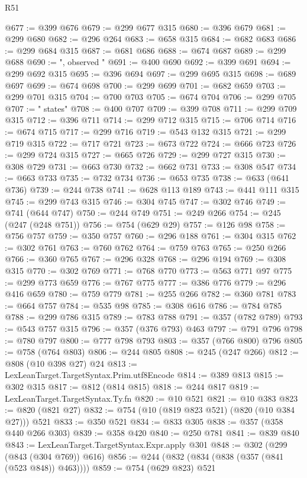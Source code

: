 \begin{lexlean}{R51}
\begin{coremodule}
@677 := @399 @676
@679 := @299 @677 @315
@680 := @396 @679
@681 := @299 @680
@682 := @296 @264
@683 := @658 @315
@684 := @682 @683
@686 := @299 @684 @315
@687 := @681 @686
@688 := @674 @687
@689 := @299 @688
@690 := ", observed "
@691 := @400 @690
@692 := @399 @691
@694 := @299 @692 @315
@695 := @396 @694
@697 := @299 @695 @315
@698 := @689 @697
@699 := @674 @698
@700 := @299 @699
@701 := @682 @659
@703 := @299 @701 @315
@704 := @700 @703
@705 := @674 @704
@706 := @299 @705
@707 := " states"
@708 := @400 @707
@709 := @399 @708
@711 := @299 @709 @315
@712 := @396 @711
@714 := @299 @712 @315
@715 := @706 @714
@716 := @674 @715
@717 := @299 @716
@719 := @543 @132 @315
@721 := @299 @719 @315
@722 := @717 @721
@723 := @673 @722
@724 := @666 @723
@726 := @299 @724 @315
@727 := @665 @726
@729 := @299 @727 @315
@730 := @308 @729
@731 := @663 @730
@732 := @662 @731
@733 := @308 @547
@734 := @663 @733
@735 := @732 @734
@736 := @653 @735
@738 := @633 (@641 @736)
@739 := @244 @738
@741 := @628 @113 @189
@743 := @441 @111 @315
@745 := @299 @743 @315
@746 := @304 @745
@747 := @302 @746
@749 := @741 (@644 @747)
@750 := @244 @749
@751 := @249 @266
@754 := @245 (@247 (@248 @751))
@756 := @754 (@629 @29)
@757 := @126 @98
@758 := @756 @757
@759 := @350 @757
@760 := @296 @188
@761 := @304 @315
@762 := @302 @761
@763 := @760 @762
@764 := @759 @763
@765 := @250 @266
@766 := @360 @765
@767 := @296 @328
@768 := @296 @194
@769 := @308 @315
@770 := @302 @769
@771 := @768 @770
@773 := @563 @771 @97
@775 := @299 @773 @659
@776 := @767 @775
@777 := @386 @776
@779 := @296 @416 @659
@780 := @759 @779
@781 := @255 @266
@782 := @360 @781
@783 := @664 @757
@784 := @535 @98
@785 := @308 @616
@786 := @784 @785
@788 := @299 @786 @315
@789 := @783 @788
@791 := @357 (@782 @789)
@793 := @543 @757 @315
@796 := @357 (@376 @793) @463
@797 := @791 @796
@798 := @780 @797
@800 := @777 @798 @793
@803 := @357 (@766 @800) @796
@805 := @758 (@764 @803)
@806 := @244 @805
@808 := @245 (@247 @266)
@812 := @808 (@10 @398 @27) @24
@813 := LexLeanTarget.TargetSyntax.Prim.utf8Encode
@814 := @389 @813
@815 := @302 @315
@817 := @812 (@814 @815)
@818 := @244 @817
@819 := LexLeanTarget.TargetSyntax.Ty.fn
@820 := @10 @521
@821 := @10 @383
@823 := @820 (@821 @27)
@832 := @754 (@10 (@819 @823 @521) (@820 (@10 @384 @27))) @521
@833 := @350 @521
@834 := @833 @305
@838 := @357 (@358 @440 @266 @303)
@839 := @358 @420
@840 := @250 @781
@841 := @839 @840
@843 := LexLeanTarget.TargetSyntax.Expr.apply @301
@848 := @302 (@299 (@843 (@304 @769)) @616)
@856 := @244 (@832 (@834 (@838 (@357 (@841 (@523 @848)) @463))))
@859 := @754 (@629 @823) @521

\end{coremodule}
\end{lexlean}
